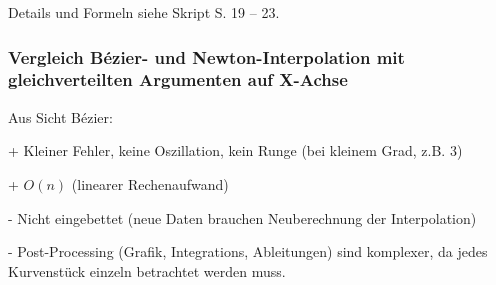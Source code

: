 Details und Formeln siehe Skript S. 19 -- 23.

\subsubsection{Vergleich Bézier- und Newton-Interpolation mit gleichverteilten Argumenten auf X-Achse}
  Aus Sicht Bézier:
  \begin{liste}
    \item[+] Kleiner Fehler, keine Oszillation, kein Runge (bei kleinem Grad, z.B. 3)
    \item[+] $O(n)$ (linearer Rechenaufwand)
    \item[-] Nicht eingebettet (neue Daten brauchen Neuberechnung der Interpolation)
    \item[-] Post-Processing (Grafik, Integrations, Ableitungen) sind komplexer, da jedes Kurvenstück
      einzeln betrachtet werden muss.
  \end{liste}
